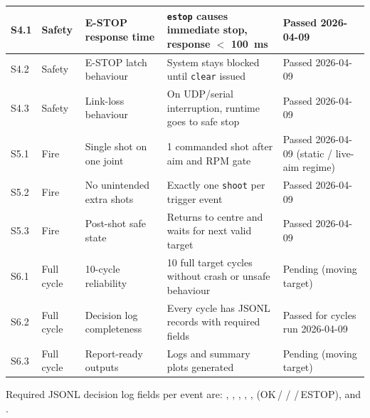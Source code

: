 {\begin{longtable}{|l|l|p{3.5cm}|p{5cm}|p{2cm}|}
\hline
S4.1 & Safety & E-STOP response time & \texttt{estop} causes immediate stop, response $<$ 100~ms & Passed 2026-04-09 \\
\hline
S4.2 & Safety & E-STOP latch behaviour & System stays blocked until \texttt{clear} issued & Passed 2026-04-09 \\
\hline
S4.3 & Safety & Link-loss behaviour & On UDP/serial interruption, runtime goes to safe stop & Passed 2026-04-09 \\
\hline
S5.1 & Fire & Single shot on one joint & 1 commanded shot after aim and RPM gate & Passed 2026-04-09 (static / live-aim regime) \\
\hline
S5.2 & Fire & No unintended extra shots & Exactly one \texttt{shoot} per trigger event & Passed 2026-04-09 \\
\hline
S5.3 & Fire & Post-shot safe state & Returns to centre and waits for next valid target & Passed 2026-04-09 \\
\hline
S6.1 & Full cycle & 10-cycle reliability & 10 full target cycles without crash or unsafe behaviour & Pending (moving target) \\
\hline
S6.2 & Full cycle & Decision log completeness & Every cycle has JSONL records with required fields & Passed for cycles run 2026-04-09 \\
\hline
S6.3 & Full cycle & Report-ready outputs & Logs and summary plots generated & Pending (moving target) \\
\hline
\end{longtable}
}

Required JSONL decision log fields per event are: , , , , ,  (OK\,/\,\,/\,\,/\,ESTOP), and .
